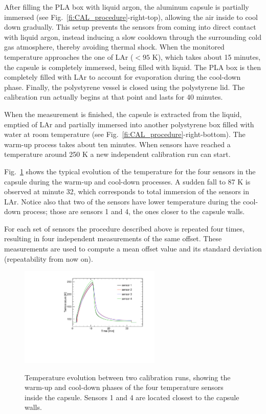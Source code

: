 After filling the PLA box with liquid argon, the aluminum capsule is partially immersed (see Fig.~\ref{fi:CAL_procedure}-right-top), allowing the air inside to cool down gradually. This setup prevents the sensors from coming into direct contact with liquid argon, instead inducing a slow cooldown through the surrounding cold gas atmosphere, thereby avoiding thermal shock. When the monitored temperature approaches the one of LAr ($< 95$ K), which takes about 15 minutes, the capsule is completely immersed, being filled with liquid. The PLA box is then completely filled with LAr to account for evaporation during the cool-down phase. Finally, the polystyrene vessel is closed using the polystyrene lid. The calibration run actually begins at that point and lasts for 40 minutes.

When the measurement is finished, the capsule is extracted from the liquid, emptied of LAr and partially immersed into another polystyrene box filled with water at room temperature (see Fig.~\ref{fi:CAL_procedure}-right-bottom). The warm-up process takes about ten minutes. When sensors have reached a temperature around 250 K a new independent calibration run can start.

Fig.~\ref{fi:CAL_pre} shows the typical evolution of the temperature for the four sensors in the capsule during the warm-up and cool-down processes. A sudden fall to 87 K is observed at minute 32, which corresponds to total immersion of the sensors in LAr. Notice also that two of the sensors have lower temperature during the cool-down process; those are sensors 1 and 4, the ones closer to the capsule walls.

For each set of sensors the procedure described above is repeated four times, resulting in four independent measurements of the same offset. These measurements are used to compute a mean offset value and its standard deviation (repeatability from now on).

\begin{figure}[htbp]
\centering
{\includegraphics[width=0.6\textwidth]{images/figure_9.pdf}}
\caption{Temperature evolution between two calibration runs, showing the warm-up and cool-down phases of the four temperature sensors inside the capsule. Sensors 1 and 4 are located closest to the capsule walls.}
\label{fi:CAL_pre}
\end{figure}

